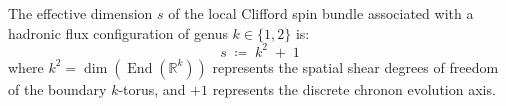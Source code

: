 \documentclass[
    12pt,
    a4paper,
    headings=normal,
    twoside=false,
    open=any,
    parskip=half
]{scrbook}
\begin{document}
\begin{physdefinition}\label{def:ch3_spin_dimension_parameter}
The effective dimension $s$ of the local Clifford spin bundle associated with a hadronic flux configuration of genus $k \in \{1, 2\}$ is:
\begin{equation}
s \;\coloneqq\; k^2 \;+\; 1
\label{eq:ch3_s_parameter_formula}
\end{equation}
where $k^2 = \dim(\operatorname{End}(\mathbb{R}^k))$ represents the spatial shear degrees of freedom of the boundary $k$-torus, and $+1$ represents the discrete chronon evolution axis.
\end{physdefinition}

\end{document}
